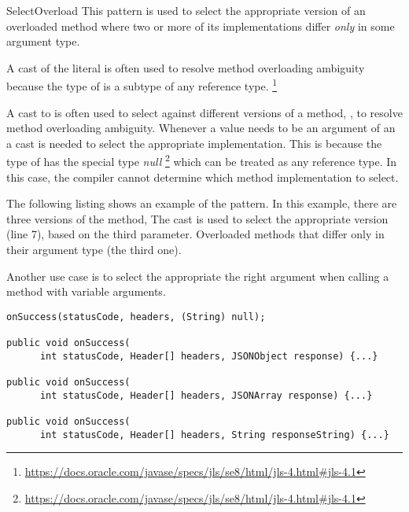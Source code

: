 \begin{pattern}{SelectOverload}
This pattern is used to select the appropriate version of an overloaded method%
where two or more of its implementations differ \emph{only} in some argument type.

A cast of the   literal is often used to 
  resolve method overloading ambiguity because the type of  
  is a subtype of any reference type.%
\footnote{\url{https://docs.oracle.com/javase/specs/jls/se8/html/jls-4.html\#jls-4.1}}


A cast to  is often used to select against different versions
of a method, \ie{}, to resolve method overloading ambiguity.
Whenever a  value needs to be an argument of an a cast is
needed to select the appropriate implementation.
This is because the type of  has the special type \emph{null}%
\footnote{\url{https://docs.oracle.com/javase/specs/jls/se8/html/jls-4.html\#jls-4.1}}
which can be treated as any reference type.
In this case,
the compiler cannot determine which method implementation to select.


\instances{}
The following listing%
\def\urlvar{http://bit.ly/loopj_android_async_http_2FENovD}
shows an example of the \thisp{} pattern.
In this example, there are three versions of the  method,
The cast  is used to select the appropriate version
(line 7), based on the third parameter.
Overloaded methods that differ only in their argument type (the third one).

Another use case is to select the appropriate the right argument when
calling a method with variable arguments.

\begin{verbatim}
onSuccess(statusCode, headers, (String) null);

public void onSuccess(
      int statusCode, Header[] headers, JSONObject response) {...}

public void onSuccess(
      int statusCode, Header[] headers, JSONArray response) {...}

public void onSuccess(
      int statusCode, Header[] headers, String responseString) {...}
\end{verbatim}


\end{pattern}
